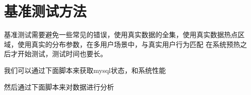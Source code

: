 \section{基准测试方法}
基准测试需要避免一些常见的错误，使用真实数据的全集，使用真实数据热点区域，使用真实的分布参数，在多用户场景中，与真实用户行为匹配
在系统预热之后才开始测试，测试时间也要长。

我们可以通过下面脚本来获取mysql状态，和系统性能


然后通过下面脚本来对数据进行分析



